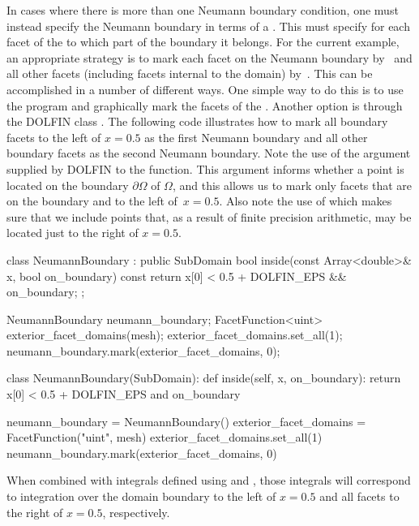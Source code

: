 In cases where there is more than one Neumann boundary condition, one
must instead specify the Neumann boundary in terms of a
. This  must specify for each
facet of the  to which part of the boundary it belongs. For
the current example, an appropriate strategy is to mark each facet on
the Neumann boundary by~ and all other facets (including facets
internal to the domain) by~. This can be accomplished in a
number of different ways. One simple way to do this is to use the
program \citet{www:meshbuilder} and graphically mark the facets of the
. Another option is through the DOLFIN class
. The following code illustrates how to mark all
boundary facets to the left of $x = 0.5$ as the first Neumann boundary and
all other boundary facets as the second Neumann boundary. Note
the use of the  argument supplied by DOLFIN to the
 function. This argument informs whether a point is
located on the boundary $\partial\Omega$ of $\Omega$, and this allows
us to mark only facets that are on the boundary and to the left of~$x
= 0.5$. Also note the use of  which makes sure that
we include points that, as a result of finite precision arithmetic,
may be located just to the right of $x = 0.5$.
\begin{c++}
class NeumannBoundary : public SubDomain
{
  bool inside(const Array<double>& x, bool on_boundary) const
  {
    return x[0] < 0.5 + DOLFIN_EPS && on_boundary;
  }
};

NeumannBoundary neumann_boundary;
FacetFunction<uint> exterior_facet_domains(mesh);
exterior_facet_domains.set_all(1);
neumann_boundary.mark(exterior_facet_domains, 0);
\end{c++}
\begin{python}
class NeumannBoundary(SubDomain):
    def inside(self, x, on_boundary):
        return x[0] < 0.5 + DOLFIN_EPS and on_boundary

neumann_boundary = NeumannBoundary()
exterior_facet_domains = FacetFunction("uint", mesh)
exterior_facet_domains.set_all(1)
neumann_boundary.mark(exterior_facet_domains, 0)
\end{python}
%
When combined with integrals defined using  and
, those integrals will correspond to integration over the
domain boundary to the left of $x = 0.5$ and all facets to the right of $x =
0.5$, respectively.

